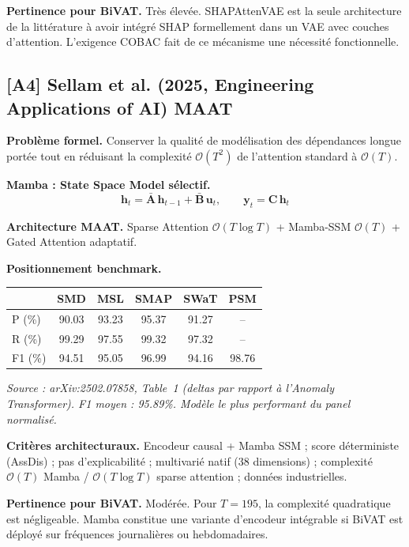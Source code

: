 \documentclass[12pt,a4paper]{article}
\newcommand{\nd}{--}
\begin{document}
\textbf{Pertinence pour BiVAT.} Très élevée. SHAPAttenVAE est la seule
architecture de la littérature à avoir intégré SHAP formellement dans un VAE
avec couches d'attention. L'exigence COBAC fait de ce mécanisme une nécessité
fonctionnelle.

\subsection{[A4] Sellam et al. (2025, Engineering Applications of AI)  MAAT}

\textbf{Problème formel.} Conserver la qualité de modélisation des dépendances
longue portée tout en réduisant la complexité $\mathcal{O}(T^2)$ de l'attention
standard à $\mathcal{O}(T)$.

\textbf{Mamba : State Space Model sélectif.}
$$\mathbf{h}_t = \bar{\mathbf{A}}\,\mathbf{h}_{t-1} +
\bar{\mathbf{B}}\,\mathbf{u}_t, \qquad \mathbf{y}_t = \mathbf{C}\,\mathbf{h}_t$$

\textbf{Architecture MAAT.} Sparse Attention $\mathcal{O}(T \log T)$ +
Mamba-SSM $\mathcal{O}(T)$ + Gated Attention adaptatif.

\textbf{Positionnement benchmark.}

\smallskip
\begin{center}
\small
\begin{tabular}{lccccc}
\toprule
& SMD & MSL & SMAP & SWaT & PSM \\
\midrule
P (\%) & 90.03 & 93.23 & 95.37 & 91.27 & \nd \\
R (\%) & 99.29 & 97.55 & 99.32 & 97.32 & \nd \\
F1 (\%) & 94.51 & 95.05 & 96.99 & 94.16 & 98.76 \\
\bottomrule
\end{tabular}
\end{center}
\smallskip
\noindent\textit{\small Source : arXiv:2502.07858, Table~1 (deltas par rapport
à l'Anomaly Transformer). F1 moyen : 95.89\%. Modèle le plus performant du
panel normalisé.}

\textbf{Critères architecturaux.} Encodeur causal + Mamba SSM ; score
déterministe (AssDis) ; pas d'explicabilité ; multivarié natif (38 dimensions) ;
complexité $\mathcal{O}(T)$ Mamba / $\mathcal{O}(T \log T)$ sparse attention ;
données industrielles.

\textbf{Pertinence pour BiVAT.} Modérée. Pour $T = 195$, la complexité
quadratique est négligeable. Mamba constitue une variante d'encodeur intégrable
si BiVAT est déployé sur fréquences journalières ou hebdomadaires.
\end{document}
